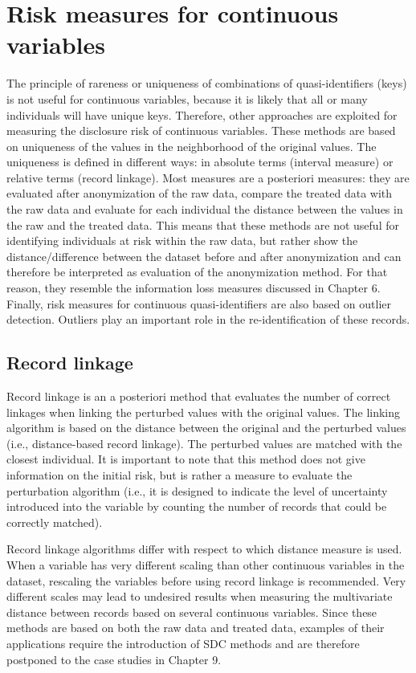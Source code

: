 \documentclass[letterpaper,10pt,english]{sphinxmanual}
\begin{document}
\section{Risk measures for continuous variables}
\label{\detokenize{measure_risk:risk-measures-for-continuous-variables}}
The principle of rareness or uniqueness of combinations of
quasi-identifiers (keys) is not useful for continuous variables, because
it is likely that all or many individuals will have unique keys.
Therefore, other approaches are exploited for measuring the disclosure
risk of continuous variables. These methods are based on uniqueness of
the values in the neighborhood of the original values. The uniqueness is
defined in different ways: in absolute terms (interval measure) or
relative terms (record linkage). Most measures are a posteriori
measures: they are evaluated after anonymization of the raw data,
compare the treated data with the raw data and evaluate for each
individual the distance between the values in the raw and the treated
data. This means that these methods are not useful for identifying
individuals at risk within the raw data, but rather show the
distance/difference between the dataset before and after anonymization
and can therefore be interpreted as evaluation of the anonymization
method. For that reason, they resemble the information loss measures
discussed in Chapter 6. Finally, risk measures for continuous
quasi-identifiers are also based on outlier detection. Outliers play an
important role in the re-identification of these records.


\subsection{Record linkage}
\label{\detokenize{measure_risk:record-linkage}}
Record linkage is an a posteriori method that evaluates the number of
correct linkages when linking the perturbed values with the original
values. The linking algorithm is based on the distance between the
original and the perturbed values (i.e., distance-based record linkage).
The perturbed values are matched with the closest individual. It is
important to note that this method does not give information on the
initial risk, but is rather a measure to evaluate the perturbation
algorithm (i.e., it is designed to indicate the level of uncertainty
introduced into the variable by counting the number of records that
could be correctly matched).

Record linkage algorithms differ with respect to which distance measure
is used. When a variable has very different scaling than other
continuous variables in the dataset, rescaling the variables before
using record linkage is recommended. Very different scales may lead to
undesired results when measuring the multivariate distance between
records based on several continuous variables. Since these methods are
based on both the raw data and treated data, examples of their
applications require the introduction of SDC methods and are therefore
postponed to the case studies in Chapter 9.
\end{document}
